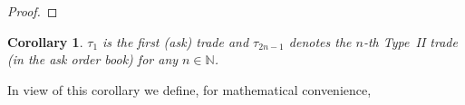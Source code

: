\documentclass[11pt]{scrartcl}
\newtheorem{corollary}[theorem]{Corollary}
\begin{document}
\begin{proof}
%
%
%
%
\end{proof}
%
\begin{corollary}
\label{type II trades as stopping times} $\tau_1$ is the first (ask) trade
and $\tau_{2n-1}$ denotes the $n$-th Type~{II} trade (in the ask order book)
for any $n\in\mathbb{N}$.
\end{corollary}
In view of this corollary we define, for mathematical convenience, 
\end{document}
